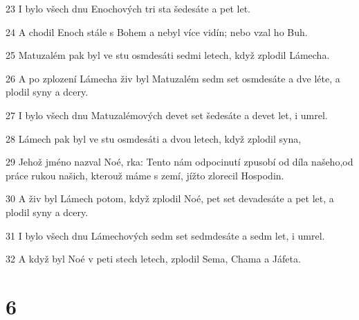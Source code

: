 \par 23 I bylo všech dnu Enochových tri sta šedesáte a pet let.
\par 24 A chodil Enoch stále s Bohem a nebyl více vidín; nebo vzal ho Buh.
\par 25 Matuzalém pak byl ve stu osmdesáti sedmi letech, když zplodil Lámecha.
\par 26 A po zplození Lámecha živ byl Matuzalém sedm set osmdesáte a dve léte, a plodil syny a dcery.
\par 27 I bylo všech dnu Matuzalémových devet set šedesáte a devet let, i umrel.
\par 28 Lámech pak byl ve stu osmdesáti a dvou letech, když zplodil syna,
\par 29 Jehož jméno nazval Noé, rka: Tento nám odpocinutí zpusobí od díla našeho,od práce rukou našich, kterouž máme s zemí, jížto zlorecil Hospodin.
\par 30 A živ byl Lámech potom, když zplodil Noé, pet set devadesáte a pet let, a plodil syny a dcery.
\par 31 I bylo všech dnu Lámechových sedm set sedmdesáte a sedm let, i umrel.
\par 32 A když byl Noé v peti stech letech, zplodil Sema, Chama a Jáfeta.

\chapter{6}

